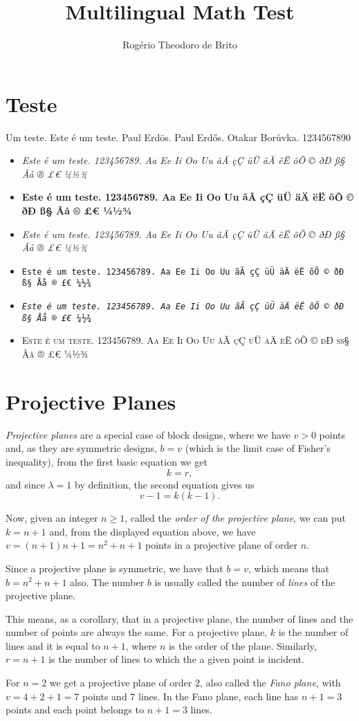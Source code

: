 \documentclass{article}
\title{Multilingual Math Test}
\author{Rogério Theodoro de Brito}
\newcommand{\texto}{Este é um teste. 123456789. Aa Ee Ii Oo Uu ãÃ çÇ üÜ
  äÄ ëË õÕ © ðÐ ß§ Åå ® £€ ¼½¾}
\begin{document}
\maketitle
\section{Teste}

Um teste. Este é um teste. Paul Erdös. Paul Erd\H{o}s. Otakar Borůvka. 1234567890

\begin{itemize}
  \item \emph{\texto}
  \item \textbf{\texto}
  \item \textsl{\texto}
  \item \texttt{\texto}
  \item \texttt{\emph{\texto}}
  \item \textsc{\texto}
\end{itemize}

\section{Projective Planes}

\emph{Projective planes} are a special case of block designs, where we
have $v > 0$ points and, as they are symmetric designs, $ b = v$ (which
is the limit case of Fisher's inequality), from the first basic equation
we get
\[
k = r,
\]
and since $\lambda = 1$ by definition, the second equation gives us
\[
v-1 = k(k-1).
\]

Now, given an integer $ n \geq 1$, called the \emph{order of the
  projective plane}, we can put $k = n + 1$ and, from the displayed
equation above, we have $v = (n+1)n + 1 = n^2 + n + 1$ points in a
projective plane of order $n$.

Since a projective plane is symmetric, we have that $b = v$, which means
that $b = n^2 + n + 1$ also. The number $b$ is usually called the number
of \emph{lines} of the projective plane.

This means, as a corollary, that in a projective plane, the number of
lines and the number of points are always the same. For a projective
plane, $k$ is the number of lines and it is equal to $n + 1$, where $n$
is the order of the plane. Similarly, $r = n + 1$ is the number of lines
to which the a given point is incident.

For $n = 2$ we get a projective plane of order $2$, also called the
\emph{Fano plane}, with $v = 4 + 2 + 1 = 7$ points and $7$ lines. In the
Fano plane, each line has $n + 1 = 3$ points and each point belongs to
$n + 1 = 3$ lines.
\end{document}

